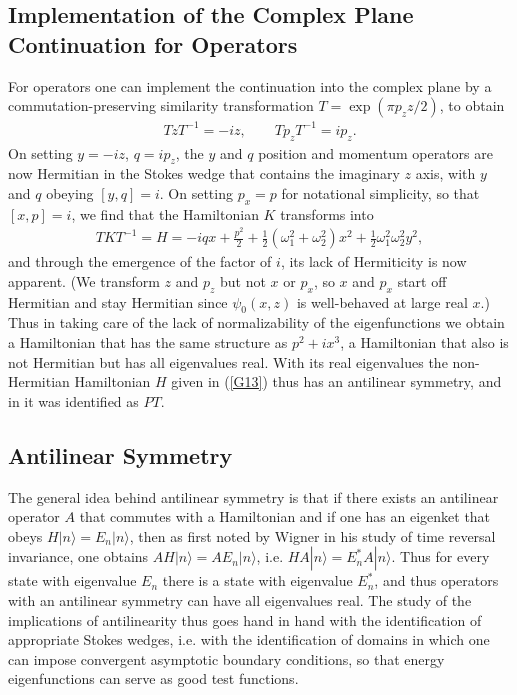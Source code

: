 \documentclass[aps]{revtex4}
\begin{document}
\subsection{Implementation of the Complex Plane Continuation for Operators}

For operators one can implement the continuation into the complex plane by a commutation-preserving similarity transformation $T=\exp(\pi p_z z/2)$, to obtain
% 
\begin{eqnarray}
TzT^{-1}=-iz,\qquad Tp_zT^{-1}=ip_z.
\label{G12}
\end{eqnarray}
%
On setting $y=-iz$, $q=ip_z$, the $y$ and $q$ position and momentum operators are now Hermitian in the Stokes wedge that contains the imaginary $z$ axis, with $y$ and $q$ obeying $[y,q]=i$. On setting $p_x=p$ for notational simplicity, so that $[x,p]=i$, we find that the Hamiltonian $K$ transforms into 
%
\begin{eqnarray}
TKT^{-1}=H=-iqx+\frac{p^2}{2}+\frac{1}{2}\left(\omega_1^2+\omega_2^2 \right)x^2+\frac{1}{2}\omega_1^2\omega_2^2y^2,
\label{G13}
\end{eqnarray}
%
and through the emergence of the factor of $i$, its lack of Hermiticity is now apparent. (We transform $z$ and $p_z$ but not $x$ or $p_x$, so $x$ and $p_x$ start off Hermitian and stay Hermitian since $\psi_0(x,z)$ is well-behaved at large real $x$.) Thus in taking care of the lack of normalizability of the eigenfunctions we obtain a Hamiltonian  that has the same structure as $p^2+ix^3$, a Hamiltonian that also is not Hermitian but has all eigenvalues real. With its real eigenvalues the non-Hermitian Hamiltonian $H$ given in (\ref{G13}) thus has an antilinear symmetry, and in \cite{Bender2008a,Bender2008b} it was identified as $PT$.

\subsection{Antilinear Symmetry}

The general idea behind antilinear symmetry is that if there exists an antilinear operator $A$ that commutes with a Hamiltonian and if one has an eigenket that obeys $H|n\rangle=E_n|n\rangle$, then as first noted by Wigner in his study of time reversal invariance, one obtains $AH|n\rangle=AE_n|n\rangle$, i.e. $HA|n\rangle=E_n^*A|n\rangle$. Thus for every state with eigenvalue $E_n$ there is a state with eigenvalue $E_n^*$, and thus operators with an antilinear symmetry can have all eigenvalues real. The study of the implications of antilinearity thus goes hand in hand with the identification of appropriate Stokes wedges, i.e. with the identification of domains in which one can impose convergent asymptotic boundary conditions, so that energy eigenfunctions can serve as good test functions.
\end{document}
